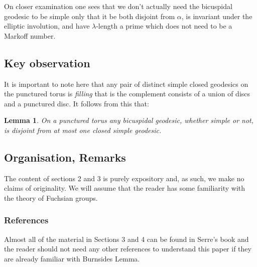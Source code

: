 \documentclass[12pt,a4paper]{amsart}
\newtheorem{thm}{Theorem}[section]
\newtheorem{lem}[thm]{Lemma}
\begin{document}
On closer examination one sees that we don't actually need the bicuspidal
geodesic to be simple only that it be both disjoint from $\alpha$,
is invariant under the elliptic involution, 
and have $\lambda$-length a prime which does not need to be a Markoff number. 

\subsection{Key observation}
It is important to note here that any pair of
distinct simple closed geodesics on the punctured torus is \textit{filling}
that is the complement consists of a union of discs and a punctured disc. It
follows from this that:

\begin{lem}\label{lem: labelling}
On a punctured torus any bicuspidal geodesic, whether simple or not, is
disjoint from at most one closed simple geodesic.
\end{lem}





\subsection{Organisation, Remarks}

The content of sections 2 and 3 is purely expository and, as such, we make no
claims of originality. We will assume that the reader has some familiarity with
the theory of Fuchsian groups.

\subsubsection{References} Almost all  of the material in Sections 3 and 4 can
be found in Serre's book \cite{serre} and the reader should not need any other
references to understand this paper if they are already familiar with
Burnsides Lemma.
\end{document}

